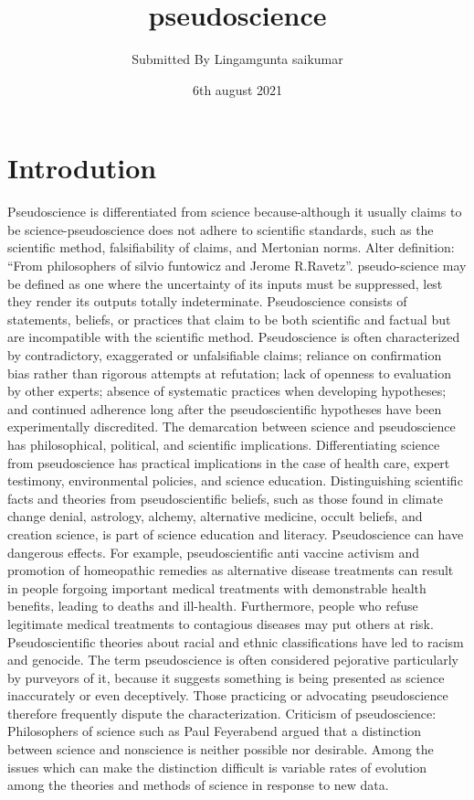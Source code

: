 \documentclass{article}
\title{pseudoscience}
\author{Submitted By Lingamgunta saikumar}
\date{6th august 2021}
\begin{document}
\maketitle

\section{Introdution}
Pseudoscience is differentiated from science because-although it usually 
claims to be science-pseudoscience does not adhere to scientific standards,
such as the scientific method, falsifiability of claims, and Mertonian norms.
Alter definition: 
“From philosophers of silvio funtowicz and Jerome R.Ravetz”.
pseudo-science may be defined as one where the uncertainty of its inputs must be 
suppressed, lest they render its outputs totally indeterminate.
Pseudoscience consists of statements, beliefs, or practices that claim to be both 
scientific and factual but are incompatible with the scientific 
method. Pseudoscience is often characterized by contradictory, exaggerated 
or unfalsifiable claims; reliance on confirmation bias rather than rigorous attempts 
at refutation; lack of openness to evaluation by other experts; absence of 
systematic practices when developing hypotheses; and continued adherence long 
after the pseudoscientific hypotheses have been experimentally discredited.
The demarcation between science and pseudoscience has philosophical, political, 
and scientific implications. Differentiating science from pseudoscience has practical 
implications in the case of health care, expert testimony, environmental policies, 
and science education. Distinguishing scientific facts and theories from 
pseudoscientific beliefs, such as those found in climate change 
denial, astrology, alchemy, alternative medicine, occult beliefs, and creation 
science, is part of science education and literacy.
Pseudoscience can have dangerous effects. For example, pseudoscientific anti vaccine activism and promotion of homeopathic remedies as alternative disease 
treatments can result in people forgoing important medical treatments with 
demonstrable health benefits, leading to deaths and ill-health. Furthermore, people 
who refuse legitimate medical treatments to contagious diseases may put others at 
risk. Pseudoscientific theories about racial and ethnic classifications have led 
to racism and genocide.
The term pseudoscience is often considered pejorative particularly by purveyors of 
it, because it suggests something is being presented as science inaccurately or even 
deceptively. Those practicing or advocating pseudoscience therefore frequently 
dispute the characterization.
Criticism of pseudoscience:
Philosophers of science such as Paul Feyerabend argued that a distinction between 
science and nonscience is neither possible nor desirable. Among the issues which 
can make the distinction difficult is variable rates of evolution among the theories 
and methods of science in response to new data.
\end{document}

